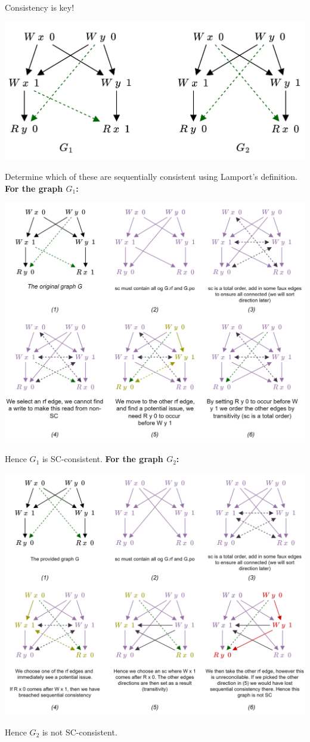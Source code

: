 \begin{examplebox}{Consistency is key!}
    \begin{center}
        \includegraphics[width=.6\textwidth]{declarative_semantics/images/example_sequential_consistency.drawio.png}
    \end{center}
    Determine which of these are sequentially consistent using Lamport's definition.
    \tcblower
    \textbf{For the graph $G_1$:}
    \begin{center}
        \includegraphics[width=.9\textwidth]{declarative_semantics/images/example_sc_lamport_g1.drawio.png}
    \end{center}  
    Hence $G_1$ is SC-consistent.
    \textbf{For the graph $G_2$:}
    \begin{center}  
        \includegraphics[width=.9\textwidth]{declarative_semantics/images/example_sc_lamport_g2.drawio.png}
    \end{center}
    Hence $G_2$ is not SC-consistent.
\end{examplebox}

